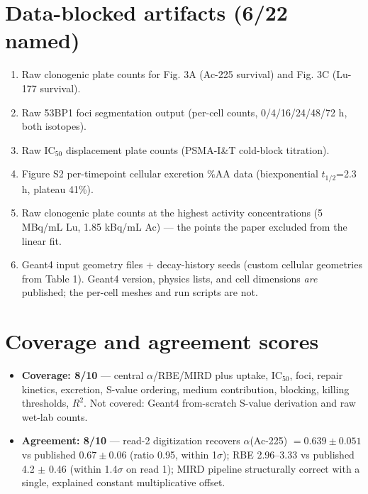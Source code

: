\documentclass[11pt]{article}
\begin{document}
\section{Data-blocked artifacts (6/22 named)}
\begin{enumerate}
  \item Raw clonogenic plate counts for Fig. 3A (Ac-225 survival) and Fig. 3C
        (Lu-177 survival).
  \item Raw 53BP1 foci segmentation output (per-cell counts, 0/4/16/24/48/72 h,
        both isotopes).
  \item Raw IC$_{50}$ displacement plate counts (PSMA-I\&T cold-block titration).
  \item Figure S2 per-timepoint cellular excretion \%AA data (biexponential
        $t_{1/2}$=2.3 h, plateau 41\%).
  \item Raw clonogenic plate counts at the highest activity concentrations
        (5 MBq/mL Lu, 1.85 kBq/mL Ac) --- the points the paper excluded from
        the linear fit.
  \item Geant4 input geometry files + decay-history seeds (custom cellular
        geometries from Table 1). Geant4 version, physics lists, and cell
        dimensions \emph{are} published; the per-cell meshes and run scripts
        are not.
\end{enumerate}

\section{Coverage and agreement scores}
\begin{itemize}
  \item \textbf{Coverage: 8/10} --- central $\alpha$/RBE/MIRD plus uptake, IC$_{50}$,
        foci, repair kinetics, excretion, S-value ordering, medium contribution,
        blocking, killing thresholds, $R^2$. Not covered: Geant4 from-scratch
        S-value derivation and raw wet-lab counts.
  \item \textbf{Agreement: 8/10} --- read-2 digitization recovers $\alpha$(Ac-225)
        $= 0.639 \pm 0.051$ vs published $0.67 \pm 0.06$ (ratio 0.95, within
        1$\sigma$); RBE 2.96--3.33 vs published 4.2 $\pm$ 0.46 (within
        1.4$\sigma$ on read 1); MIRD pipeline structurally correct with a
        single, explained constant multiplicative offset.
\end{itemize}


\end{document}
